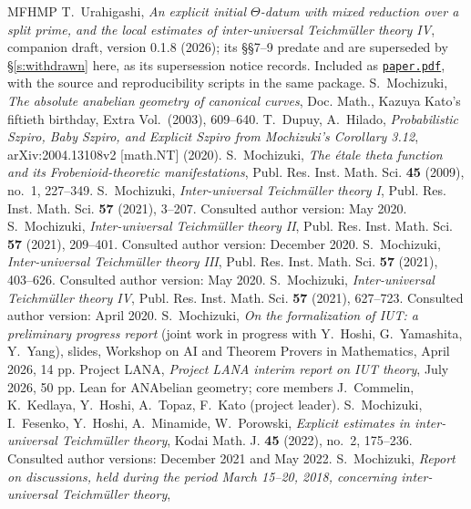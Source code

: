 \documentclass[11pt]{article}
\theoremstyle{plain}
\theoremstyle{definition}
\begin{document}
\begin{thebibliography}{MFHMP}
 T.~Urahigashi, \emph{An explicit initial $\Theta$-datum
 with mixed reduction over a split prime, and the local estimates of
 inter-universal Teichm\"uller theory IV}, companion draft, version
 0.1.8 (2026); its \S\S7--9 predate and are superseded by \S\ref{s:withdrawn}
 here, as its supersession notice records.  Included as \href{paper.pdf}{\texttt{paper.pdf}},
 with the source and reproducibility scripts in the same package.
 S.~Mochizuki, \emph{The absolute anabelian geometry of
 canonical curves}, Doc. Math., Kazuya Kato's fiftieth birthday, Extra Vol.\
 (2003), 609--640.
 T.~Dupuy, A.~Hilado, \emph{Probabilistic Szpiro, Baby Szpiro,
 and Explicit Szpiro from Mochizuki's Corollary 3.12}, arXiv:2004.13108v2
 [math.NT] (2020).
 S.~Mochizuki, \emph{The \'etale theta function and its
 Frobenioid-theoretic manifestations}, Publ. Res. Inst. Math. Sci.
 \textbf{45} (2009), no.~1, 227--349.
 S.~Mochizuki, \emph{Inter-universal Teichm\"uller theory I},
 Publ. Res. Inst. Math. Sci. \textbf{57} (2021), 3--207.
 Consulted author version: May 2020.
 S.~Mochizuki, \emph{Inter-universal Teichm\"uller theory II},
 Publ. Res. Inst. Math. Sci. \textbf{57} (2021), 209--401.
 Consulted author version: December 2020.
 S.~Mochizuki, \emph{Inter-universal Teichm\"uller theory III},
 Publ. Res. Inst. Math. Sci. \textbf{57} (2021), 403--626.
 Consulted author version: May 2020.
 S.~Mochizuki, \emph{Inter-universal Teichm\"uller theory IV},
 Publ. Res. Inst. Math. Sci. \textbf{57} (2021), 627--723.
 Consulted author version: April 2020.
 S.~Mochizuki, \emph{On the formalization of IUT: a preliminary
 progress report} (joint work in progress with Y.~Hoshi, G.~Yamashita, Y.~Yang),
 slides, Workshop on AI and Theorem Provers in Mathematics, April 2026, 14 pp.
\bibitem[LANA]{LANA} Project LANA, \emph{Project LANA interim report on IUT theory},
 July 2026, 50 pp.  Lean for ANAbelian geometry; core members J.~Commelin,
 K.~Kedlaya, Y.~Hoshi, A.~Topaz, F.~Kato (project leader).
 S.~Mochizuki, I.~Fesenko, Y.~Hoshi, A.~Minamide,
 W.~Porowski, \emph{Explicit estimates in inter-universal Teichm\"uller theory},
 Kodai Math. J. \textbf{45} (2022), no.~2, 175--236.
 Consulted author versions: December 2021 and May 2022.
 S.~Mochizuki, \emph{Report on discussions, held during the
 period March 15--20, 2018, concerning inter-universal Teichm\"uller theory},

\end{thebibliography}
\end{document}
